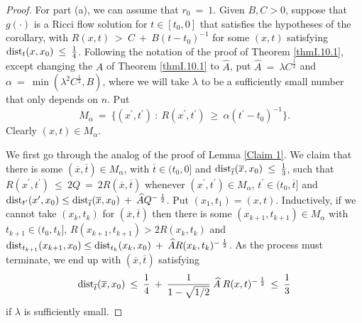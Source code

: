 \begin{proof}
For part (a), we can assume that $r_0 \: = \: 1$. Given $B,C > 0$,
suppose that $g(\cdot)$ is a Ricci flow solution for
$t \in [t_0, 0]$ that satisfies the hypotheses of the corollary,
with $R(x, t) \: > \: C \: + \: B(t - t_0)^{-1}$
for some $(x, t)$ satisfying $\operatorname{dist}_t(x, x_0) \: \le \: \frac{1}{4}$.
Following the notation of the proof of Theorem \ref{thmI.10.1},
except changing the $A$ of Theorem \ref{thmI.10.1} to
$\widehat{A}$,
put $\widehat{A} \: = \: \lambda C^{\frac12}$ and $\alpha \: = \:
\min(\lambda^2 C^{\frac12}, B)$, where we will take $\lambda$ to be a
sufficiently small number that only depends on $n$. Put
\begin{equation}
M_\alpha \: = \: \{(x^\prime, t^\prime) \: : \: R(x^\prime, t^\prime) \: \ge \:
\alpha (t^\prime-t_0)^{-1}\}.
\end{equation}
Clearly $(x, t) \in M_\alpha$.

We first go through the analog of the proof of Lemma \ref{Claim 1}.
We claim that there is some $(\overline{x}, \overline{t}) \in
M_\alpha$, with $\overline{t} \in (t_0, 0]$ and
$\operatorname{dist}_{\overline{t}}(\overline{x}, x_0) \: \le \: \frac13$, such that
$R(x^\prime, t^\prime) \: \le \: 2 Q \: =
\: 2R(\overline{x}, \overline{t})$ whenever
$(x^\prime, t^\prime) \in M_\alpha$, $t^\prime \in (t_0, \overline{t}]$
and $\operatorname{dist}_{t^\prime}(x^\prime, x_0) \le
\operatorname{dist}_{\overline{t}}(\overline{x}, x_0) \: + \: \widehat{A}Q^{- \: \frac12}$.
Put $(x_1, t_1) = (x, t)$. Inductively, if we cannot take
$(x_k, t_k)$ for $(\overline{x}, \overline{t})$ then there is some
$(x_{k+1}, t_{k+1}) \in M_\alpha$ with
$t_{k+1} \in (t_0, t_k]$,
$R(x_{k+1}, t_{k+1}) > 2
R(x_k, t_k)$ and $\operatorname{dist}_{t_{k+1}}(x_{k+1}, x_0) \le
\operatorname{dist}_{t_k}(x_k, x_0) \: + \: \widehat{A}R(x_k, t_k)^{- \: \frac12}$. As the
process must terminate, we end up with $(\overline{x}, \overline{t})$
satisfying
\begin{equation}
\operatorname{dist}_{\overline{t}}(\overline{x}, x_0) \: \le \: \frac14
\: + \: \frac{1}{1-\sqrt{1/2}} \: \widehat{A} \: R(x,t)^{- \: \frac12}
\: \le \: \frac13
\end{equation}
if $\lambda$ is sufficiently small.


\end{proof}
